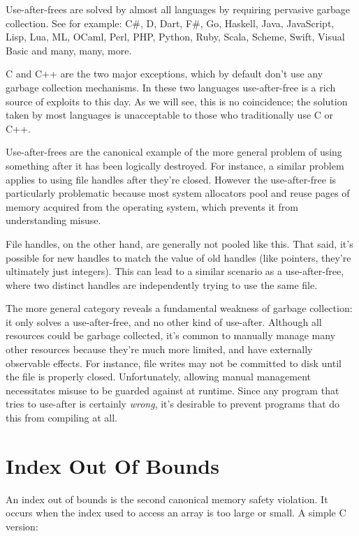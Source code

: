 Use-after-frees are solved by almost all languages by requiring
pervasive garbage collection. See for example: C\#, D, Dart, F\#, Go, Haskell, Java,
JavaScript, Lisp, Lua, ML, OCaml, Perl, PHP, Python, Ruby, Scala, Scheme, Swift,
Visual Basic and many, many, more.

C and C++ are the two major exceptions, which
by default don't use any garbage collection mechanisms. In these two languages
use-after-free is a rich source of exploits to this day. As we will
see, this is no coincidence; the solution taken by most languages is
unacceptable to those who traditionally use C or C++.

Use-after-frees are the canonical example of the more general problem of
using something after it has been logically destroyed. For instance, a similar
problem applies to using file handles after they're closed. However the
use-after-free is particularly problematic because most system allocators
pool and reuse pages of memory acquired from the operating system, which prevents
it from understanding misuse.

File handles, on the other hand, are generally not pooled like this. That said,
it's possible for new handles to match the value of old handles
(like pointers, they're ultimately just integers). This can lead to a similar
scenario as a use-after-free, where two distinct handles are independently
trying to use the same file.

The more general category reveals a fundamental weakness of garbage collection:
it only solves a use-after-free, and no other kind of use-after. Although all
resources could be garbage collected, it's common to manually manage many other
resources because they're much more limited, and have externally observable
effects. For instance, file writes may not be committed to disk until the file
is properly closed. Unfortunately, allowing manual management necessitates
misuse to be guarded against at runtime. Since any program that tries to use-after
is certainly \emph{wrong}, it's desirable to prevent programs that do this from
compiling at all.




\section{Index Out Of Bounds}

An index out of bounds is the second canonical memory safety violation. It
occurs when the index used to access an array is too large or small. A simple
C version:

